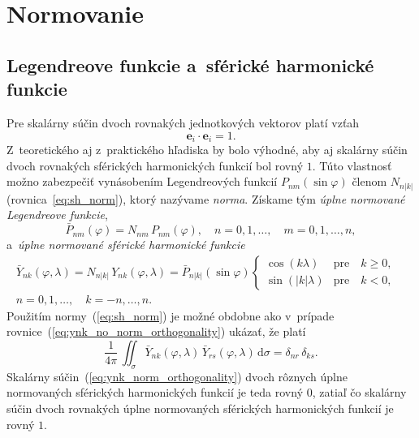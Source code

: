 \documentclass[a4paper, 12pt]{book}
\newcommand{\diff}{\mathrm d}
\let\vec\mathbf
\begin{document}
\section{Normovanie}
\label{sec:normalization}

\subsection{Legendreove funkcie a~sférické harmonické funkcie}

Pre skalárny súčin dvoch rovnakých jednotkových vektorov platí vzťah
%
\begin{equation}
\vec e_i \cdot \vec e_i = 1{.}
\end{equation}
%
Z~teoretického aj z~praktického hľadiska by bolo výhodné, aby aj skalárny súčin 
dvoch rovnakých sférických harmonických funkcií bol rovný $1$.  Túto vlastnosť 
možno zabezpečiť vynásobením Legendreových funkcií $P_{nm}(\sin\varphi)$ členom 
$N_{n|k|}$ (rovnica~\ref{eq:sh_norm}), ktorý nazývame \emph{norma}.  Získame 
tým \emph{úplne normované Legendreove funkcie},
%
\begin{equation}
\bar{P}_{nm}(\varphi) = N_{nm} \, P_{nm}(\varphi){,} \quad  n = 0, 1, \dots, 
\quad m = 0, 1, \dots, n{,}
\end{equation}
%
a~\emph{úplne normované sférické harmonické funkcie}
%
\begin{equation}
\label{eq:ynk_norm}
\begin{split}
\bar{Y}_{nk}(\varphi, \lambda) = N_{n|k|} \, Y_{nk}(\varphi, \lambda) 
= \bar{P}_{n|k|}(\sin\varphi)
%
\begin{cases}
\cos(k\lambda)    &\text{pre} \quad k \geq 0{,}\\
\sin(|k|\lambda)  &\text{pre} \quad k < 0{,}
\end{cases}
&
%
\\
n = 0, 1, \dots, \quad k = -n, \dots, n{.}&
\end{split}
\end{equation}
%
Použitím normy~(\ref{eq:sh_norm}) je možné obdobne ako v~prípade 
rovnice~(\ref{eq:ynk_no_norm_orthogonality}) ukázať, že platí
%
\begin{equation}
\label{eq:ynk_norm_orthogonality}
\frac{1}{4\pi} \, \iint_{\sigma} \bar{Y}_{nk}(\varphi, \lambda) \, 
\bar{Y}_{rs}(\varphi, \lambda) \, \diff \sigma = \delta_{nr} \, \delta_{ks}{.}
\end{equation}
%
Skalárny súčin~(\ref{eq:ynk_norm_orthogonality}) dvoch rôznych úplne 
normovaných sférických harmonických funkcií je teda rovný 0, zatiaľ čo skalárny 
súčin dvoch rovnakých úplne normovaných sférických harmonických funkcií je 
rovný $1$.
\end{document}
